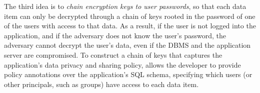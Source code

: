 

The third idea is to {\em chain encryption keys to user passwords}, so
that each data item can only be decrypted through a chain of keys
rooted in the password of one of the users with access to that data.
As a result, if the user is not logged into the application, and if
the adversary does not know the user's password, the adversary cannot
decrypt the user's data, even if the DBMS and the application server
are compromised.  To construct a chain of keys that captures the
application's data privacy and sharing policy, \name allows the
developer to provide policy annotations over the application's SQL
schema, specifying which users (or other principals, such as groups)
have access to each data item.






